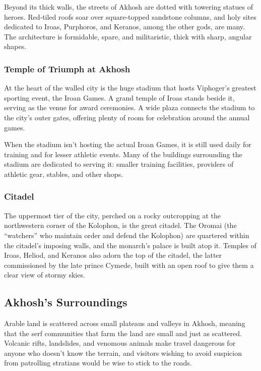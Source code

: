     Beyond its thick walls, the streets of Akhosh are dotted with towering statues of heroes.
    Red-tiled roofs soar over square-topped sandstone columns, and holy sites dedicated to Iroas, Purphoros, and Keranos, among the other gods, are many.
    The architecture is formidable, spare, and militaristic, thick with sharp, angular shapes.

    \subsubsection{Temple of Triumph at Akhosh}
        At the heart of the walled city is the huge stadium that hosts Viphoger's greatest sporting event, the Iroan Games.
        A grand temple of Iroas stands beside it, serving as the venue for award ceremonies.
        A wide plaza connects the stadium to the city's outer gates, offering plenty of room for celebration around the annual games.

        When the stadium isn't hosting the actual Iroan Games, it is still used daily for training and for lesser athletic events.
        Many of the buildings surrounding the stadium are dedicated to serving it: smaller training facilities, providers of athletic gear, stables, and other shops.

    \subsubsection{Citadel}
        The uppermost tier of the city, perched on a rocky outcropping at the northwestern corner of the Kolophon, is the great citadel.
        The Oromai (the ``watchers'' who maintain order and defend the Kolophon) are quartered within the citadel's imposing walls, and the monarch's palace is built atop it.
        Temples of Iroas, Heliod, and Keranos also adorn the top of the citadel, the latter commissioned by the late prince Cymede, built with an open roof to give them a clear view of stormy skies.

\subsection*{Akhosh's Surroundings}
    Arable land is scattered across small plateaus and valleys in Akhosh, meaning that the serf communities that farm the land are small and just as scattered.
    Volcanic rifts, landslides, and venomous animals make travel dangerous for anyone who doesn't know the terrain, and visitors wishing to avoid suspicion from patrolling stratians would be wise to stick to the roads.

